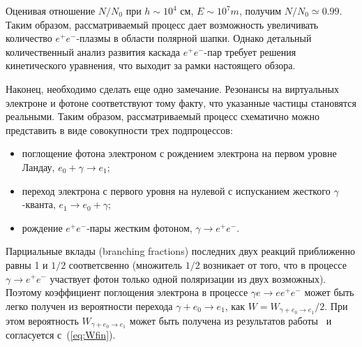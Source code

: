 Оценивая отношение $N/N_0$ при $h \sim 10^4$ см, $E \sim 10^{7} m$, 
получим $N/N_0 \simeq 0.99$. Таким образом, рассматриваемый 
процесс дает возможность  увеличивать количество $e^+e^-$-плазмы в области 
полярной шапки. Однако детальный количественный анализ 
развития каскада  $e^+e^-$-пар требует 
решения кинетического уравнения, что выходит за рамки настоящего обзора.

Наконец, необходимо сделать еще одно замечание.  Резонансы 
на виртуальных электроне и 
фотоне соответствуют тому факту, что указанные частицы становятся 
реальными. Таким образом,  
рассматриваемый процесс схематично можно представить в виде совокупности трех 
подпроцессов: 
\begin{itemize}
\item
поглощение фотона электроном с рождением электрона на первом уровне Ландау, $e_0+\gamma \to e_1$; 

\item
переход электрона с первого уровня на нулевой с испусканием жесткого $\gamma$-кванта, 
$e_1 \to e_0 + \gamma$;

\item
рождение $e^+e^-$-пары жестким фотоном, $\gamma \to e^+e^-$.

\end{itemize}

Парциальные вклады (branching fractions) последних двух 
реакций приближенно равны 1 и $1/2$ соответсвенно 
(множитель $1/2$ возникает от того, 
что в процессе $\gamma \to e^+e^-$ участвует фотон только одной поляризации из двух возможных). 
Поэтому коэффициент поглощения электрона в  процессе  
$\gamma e \to e e^+e^-$ может быть легко получен из 
вероятности перехода $\gamma + e_0  \to e_1$, как $W = W_{\gamma + e_0 \to e_1}/2$. 
При этом вероятность $W_{\gamma + e_0 \to e_1}$ может быть получена из результатов 
работы~\cite{Latal:1986} и согласуется с~(\ref{eq:Wfin}).
 
 